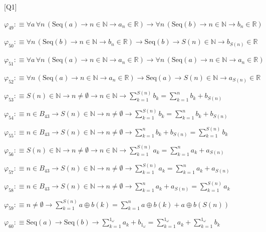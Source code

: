 \begin{fullproof}{[Q1]}
\begin{abbrevlist}
\item $\varphi_{49} :\equiv \forall a\,\forall n\,(\mathrm{Seq}(a) \to n \in \mathbb{N} \to a_{n} \in \mathbb{R}) \to \forall n\,(\mathrm{Seq}(b) \to n \in \mathbb{N} \to b_{n} \in \mathbb{R})$
\item $\varphi_{50} :\equiv \forall n\,(\mathrm{Seq}(b) \to n \in \mathbb{N} \to b_{n} \in \mathbb{R}) \to \mathrm{Seq}(b) \to S(n) \in \mathbb{N} \to b_{S(n)} \in \mathbb{R}$
\item $\varphi_{51} :\equiv \forall a\,\forall n\,(\mathrm{Seq}(a) \to n \in \mathbb{N} \to a_{n} \in \mathbb{R}) \to \forall n\,(\mathrm{Seq}(a) \to n \in \mathbb{N} \to a_{n} \in \mathbb{R})$
\item $\varphi_{52} :\equiv \forall n\,(\mathrm{Seq}(a) \to n \in \mathbb{N} \to a_{n} \in \mathbb{R}) \to \mathrm{Seq}(a) \to S(n) \in \mathbb{N} \to a_{S(n)} \in \mathbb{R}$
\item $\varphi_{53} :\equiv S(n) \in \mathbb{N} \to n \neq \emptyset \to n \in \mathbb{N} \to {\textstyle\sum_{k=1}^{S(n)} b_{k}} = {\textstyle\sum_{k=1}^{n} b_{k}} + b_{S(n)}$
\item $\varphi_{54} :\equiv n \in B_{43} \to S(n) \in \mathbb{N} \to n \neq \emptyset \to {\textstyle\sum_{k=1}^{S(n)} b_{k}} = {\textstyle\sum_{k=1}^{n} b_{k}} + b_{S(n)}$
\item $\varphi_{55} :\equiv n \in B_{43} \to S(n) \in \mathbb{N} \to n \neq \emptyset \to {\textstyle\sum_{k=1}^{n} b_{k}} + b_{S(n)} = {\textstyle\sum_{k=1}^{S(n)} b_{k}}$
\item $\varphi_{56} :\equiv S(n) \in \mathbb{N} \to n \neq \emptyset \to n \in \mathbb{N} \to {\textstyle\sum_{k=1}^{S(n)} a_{k}} = {\textstyle\sum_{k=1}^{n} a_{k}} + a_{S(n)}$
\item $\varphi_{57} :\equiv n \in B_{43} \to S(n) \in \mathbb{N} \to n \neq \emptyset \to {\textstyle\sum_{k=1}^{S(n)} a_{k}} = {\textstyle\sum_{k=1}^{n} a_{k}} + a_{S(n)}$
\item $\varphi_{58} :\equiv n \in B_{43} \to S(n) \in \mathbb{N} \to n \neq \emptyset \to {\textstyle\sum_{k=1}^{n} a_{k}} + a_{S(n)} = {\textstyle\sum_{k=1}^{S(n)} a_{k}}$
\item $\varphi_{59} :\equiv n \neq \emptyset \to {\textstyle\sum_{k=1}^{S(n)} a \oplus b(k)} = {\textstyle\sum_{k=1}^{n} a \oplus b(k)} + a \oplus b(S(n))$
\item $\varphi_{60} :\equiv \mathrm{Seq}(a) \to \mathrm{Seq}(b) \to {\textstyle\sum_{k=1}^{1_{\omega}} a_{k}} + b_{1_{\omega}} = {\textstyle\sum_{k=1}^{1_{\omega}} a_{k}} + {\textstyle\sum_{k=1}^{1_{\omega}} b_{k}}$

\end{abbrevlist}
\end{fullproof}

